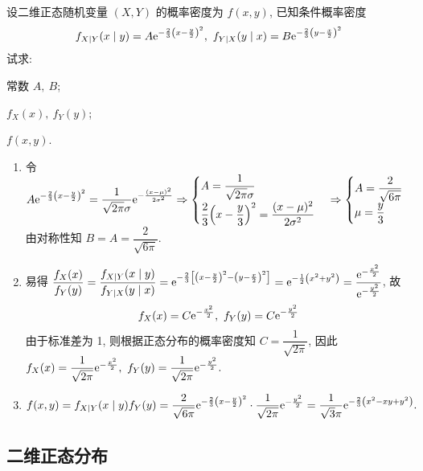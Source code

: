 \begin{example}
    设二维正态随机变量 $(X,Y)$ 的概率密度为 $f(x,y)$, 已知条件概率密度 $$f_{X\mid Y}(x\mid y)=A\mathrm{e}^{-\frac{2}{3}\qty(x-\frac{y}{2})^2},~f_{Y\mid X}(y\mid x)=B\mathrm{e}^{-\frac{2}{3}\qty(y-\frac{x}{2})^2}$$
    试求: \begin{enumerate*}[label=(\arabic{*})]
        \item 常数 $A,~B$;
        \item $f_X(x),~f_Y(y)$;
        \item $f(x,y)$.
    \end{enumerate*}
\end{example}
\begin{solution}
    \begin{enumerate}[label=(\arabic{*})]
        \item 令 $\displaystyle A\mathrm{e}^{-\frac{2}{3}\qty(x-\frac{y}{2})^2}=\dfrac{1}{\sqrt{2\pi}\sigma}\mathrm{e}^{-\frac{(x-\mu)^2}{2\sigma^2}}\Rightarrow \begin{cases}
            A=\dfrac{1}{\sqrt{2\pi}\sigma}\\[6pt]
            \dfrac{2}{3}\qty(x-\dfrac{y}{3})^2=\dfrac{(x-\mu)^2}{2\sigma^2}
        \end{cases}\Rightarrow\begin{cases}
            A=\dfrac{2}{\sqrt{6\pi}}\\[6pt]
            \mu=\dfrac{y}{3}
        \end{cases}$ 由对称性知 $B=A=\dfrac{2}{\sqrt{6\pi}}.$
        \item 易得 $\dfrac{f_X(x)}{f_Y(y)}=\dfrac{f_{X\mid Y}(x\mid y)}{f_{Y\mid X}(y\mid x)}=\mathrm{e}^{-\frac{2}{3}\qty[\qty(x-\frac{y}{2})^2-\qty(y-\frac{x}{2})^2]}=\mathrm{e}^{-\frac{1}{2}\qty(x^2+y^2)}=\dfrac{\mathrm{e}^{-\frac{x^2}{2}}}{\mathrm{e}^{-\frac{y^2}{2}}}$, 故 $$f_X(x)=C\mathrm{e}^{-\frac{x^2}{2}},~f_Y(y)=C\mathrm{e}^{-\frac{y^2}{2}}$$
        由于标准差为 1, 则根据正态分布的概率密度知 $C=\dfrac{1}{\sqrt{2\pi}}$, 因此 $f_X(x)=\dfrac{1}{\sqrt{2\pi}}\mathrm{e}^{-\frac{x^2}{2}},~f_Y(y)=\dfrac{1}{\sqrt{2\pi}}\mathrm{e}^{-\frac{y^2}{2}}.$
        \item $f(x,y)=f_{X\mid Y}(x\mid y)f_Y(y)=\dfrac{2}{\sqrt{6\pi}}\mathrm{e}^{-\frac{2}{3}\qty(x-\frac{y}{2})^2}\cdot \dfrac{1}{\sqrt{2\pi}}\mathrm{e}^{-\frac{y^2}{2}}=\dfrac{1}{\sqrt{3}\pi}\mathrm{e}^{-\frac{2}{3}\qty(x^2-xy+y^2)}.$
    \end{enumerate}
\end{solution}

\subsection{二维正态分布}

